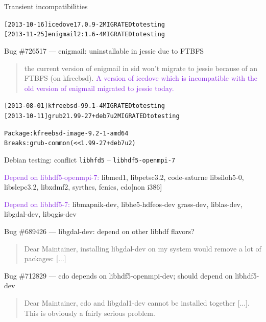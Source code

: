 \documentclass[xcolor={dvipsnames}]{beamer}
\newcommand{\EEE}[1]{\textcolor{BlueViolet}{#1}}
\begin{document}
\begin{frame}[fragile]{Transient incompatibilities}

\begin{alltt}
[2013-10-16] icedove 17.0.9-2 MIGRATED to testing
[2013-11-25] enigmail 2:1.6-4 MIGRATED to testing
\end{alltt}

Bug \#726517 ---  enigmail: uninstallable in jessie due to FTBFS
\begin{quote}
the current version of enigmail in sid won’t migrate to jessie
because of an FTBFS (on kfreebsd). \EEE{A version of icedove which
is incompatible with the old version of enigmail migrated to
jessie today.}
\end{quote}

\vspace{0.5em}

\begin{alltt}
[2013-08-01] kfreebsd-9 9.1-4 MIGRATED to testing
[2013-10-11] grub2 1.99-27+deb7u2 MIGRATED to testing
\end{alltt}

\begin{alltt}
Package: kfreebsd-image-9.2-1-amd64
Breaks: grub-common (<< 1.99-27+deb7u2)
\end{alltt}

\end{frame}

\begin{frame}{Debian testing: conflict \texttt{libhfd5} -- \texttt{libhdf5-openmpi-7}}

\EEE{Depend on libhdf5-openmpi-7:} libmed1, libpetsc3.2, code-saturne
libsiloh5-0, libslepc3.2, libxdmf2, syrthes, fenics, cdo[non i386]

\vspace{0.5em}

\EEE{Depend on libhdf5-7:} libmapnik-dev, libhe5-hdfeos-dev
grass-dev, liblas-dev, libgdal-dev, libqgis-dev

\vspace{2em}

Bug \#689426 --- libgdal-dev: depend on other libhdf flavors?
\begin{quote}
Dear Maintainer, 
installing libgdal-dev on my system would remove a lot of packages: [...]
\end{quote}
Bug \#712829 --- cdo depends on libhdf5-openmpi-dev; should depend on libhdf5-dev
\begin{quote}
Dear Maintainer,
cdo and libgdal1-dev cannot be installed together [...].
This is obviously a fairly serious
problem.
\end{quote}

\end{frame}
\end{document}
